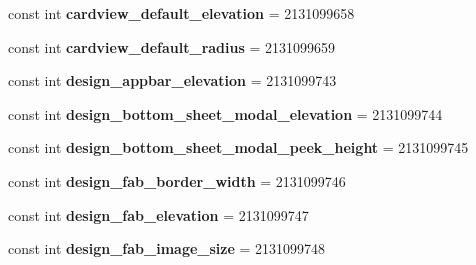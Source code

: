 \begin{DoxyCompactItemize}
const int {\bfseries cardview\+\_\+default\+\_\+elevation} = 2131099658
\item 
\mbox{\label{class_sample_app_1_1_droid_1_1_resource_1_1_dimension_aa9d5f8b2c461ccfb0d7373471ee5fb5a}} 
const int {\bfseries cardview\+\_\+default\+\_\+radius} = 2131099659
\item 
\mbox{\label{class_sample_app_1_1_droid_1_1_resource_1_1_dimension_a5be36b58f169c95af2e30b155c81f461}} 
const int {\bfseries design\+\_\+appbar\+\_\+elevation} = 2131099743
\item 
\mbox{\label{class_sample_app_1_1_droid_1_1_resource_1_1_dimension_a7e880b0832cc94c4b998918feaa25ed2}} 
const int {\bfseries design\+\_\+bottom\+\_\+sheet\+\_\+modal\+\_\+elevation} = 2131099744
\item 
\mbox{\label{class_sample_app_1_1_droid_1_1_resource_1_1_dimension_a699762565a0818ad7e97005bbbfe3502}} 
const int {\bfseries design\+\_\+bottom\+\_\+sheet\+\_\+modal\+\_\+peek\+\_\+height} = 2131099745
\item 
\mbox{\label{class_sample_app_1_1_droid_1_1_resource_1_1_dimension_adaa94e2882065e09a2df98dea40dab71}} 
const int {\bfseries design\+\_\+fab\+\_\+border\+\_\+width} = 2131099746
\item 
\mbox{\label{class_sample_app_1_1_droid_1_1_resource_1_1_dimension_a61427bfad26cc55cc38c953b8716779e}} 
const int {\bfseries design\+\_\+fab\+\_\+elevation} = 2131099747
\item 
\mbox{\label{class_sample_app_1_1_droid_1_1_resource_1_1_dimension_a6e883ea233d36fb4b6ebaf4a921d78ce}} 
const int {\bfseries design\+\_\+fab\+\_\+image\+\_\+size} = 2131099748
\item 
\mbox{\label{class_sample_app_1_1_droid_1_1_resource_1_1_dimension_a21ac10748dbbb7516ac1661decf12309}} 

\end{DoxyCompactItemize}
